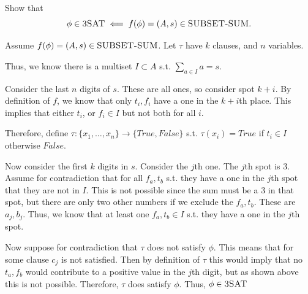 \documentclass[12pt, letterpaper]{article}
\begin{document}
\begin{subproblem}{}
    Show that
    \[ \phi \in \textsc{3SAT} \impliedby f(\phi) = (A,s) \in \textsc{SUBSET-SUM}.\]
\end{subproblem}
\begin{problemproof}
    Assume $f(\phi)=(A,s) \in \textsc{SUBSET-SUM}$. Let $\tau$ have $k$ clauses, and $n$ variables.

    Thus, we know there is a multiset $I \subset A$ s.t. $\sum_{a \in I} a = s$.

    Consider the last $n$ digits of $s$. These are all ones, so consider spot $k+i$. By definition of $f$, we know that only $t_i,f_i$ have a one in the $k+i$th place. This implies that either $t_i$, or $f_i \in I$ but not both for all $i$.

    Therefore, define $\tau : \{x_1,\dots,x_n\} \to \{True, False\}$ s.t. $\tau(x_i)=True$ if $t_i \in I$ otherwise $False$.

    Now consider the first $k$ digits in $s$. Consider the $j$th one. The $j$th spot is 3. Assume for contradiction that for all $f_a,t_b$ s.t. they have a one in the $j$th spot that they are not in $I$. This is not possible since the sum must be a $3$ in that spot, but there are only two other numbers if we exclude the $f_a,t_b$. These are $a_j,b_j$. Thus, we know that at least one $f_a,t_b \in I$ s.t. they have a one in the $j$th spot.

    Now suppose for contradiction that $\tau$ does not satisfy $\phi$. This means that for some clause $c_j$ is not satisfied. Then by definition of $\tau$ this would imply that no $t_a,f_b$ would contribute to a positive value in the $j$th digit, but as shown above this is not possible. Therefore, $\tau$ does satisfy $\phi$. Thus, $\phi \in \textsc{3SAT}$
\end{problemproof}
\end{document}
